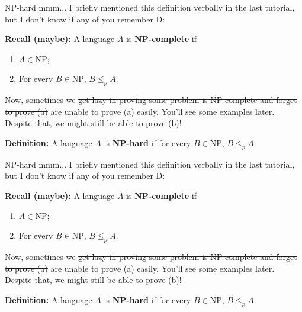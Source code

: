 \documentclass{beamer}
\begin{document}
\begin{frame}{NP-hard \emojiflushed}
mmm... I briefly mentioned this definition verbally in the last tutorial, but I don't know if any of you remember D:

\vspace{2mm}

\textbf{Recall (maybe):} A language $A$ is \textbf{NP-complete} if \begin{enumerate}[label=(\alph*)]
\item $A \in \text{NP}$;
\item For every $B \in \text{NP}$, $B \leq_p A$.
\end{enumerate}

\vspace{2mm}

Now, sometimes we \sout{get lazy in proving some problem is NP-complete and forget to prove (a)} are unable to prove (a) easily. You'll see some examples later. Despite that, we might still be able to prove (b)! 

\vspace{2mm}

\textbf{Definition:} A language $A$ is \textbf{NP-hard} if for every $B \in \text{NP}$, $B \leq_p A$.

\end{frame}

\begin{frame}{NP-hard \emojiflushed}
mmm... I briefly mentioned this definition verbally in the last tutorial, but I don't know if any of you remember D:

\vspace{2mm}

\textbf{Recall (maybe):} A language $A$ is \textbf{NP-complete} if \begin{enumerate}[label=(\alph*)]
\item $A \in \text{NP}$;
\item For every $B \in \text{NP}$, $B \leq_p A$.
\end{enumerate}

\vspace{2mm}

Now, sometimes we \sout{get lazy in proving some problem is NP-complete and forget to prove (a)} are unable to prove (a) easily. You'll see some examples later. Despite that, we might still be able to prove (b)! 

\vspace{2mm}

\textbf{Definition:} A language $A$ is \textbf{NP-hard} if for every $B \in \text{NP}$, $B \leq_p A$.

\end{frame}
\end{document}
